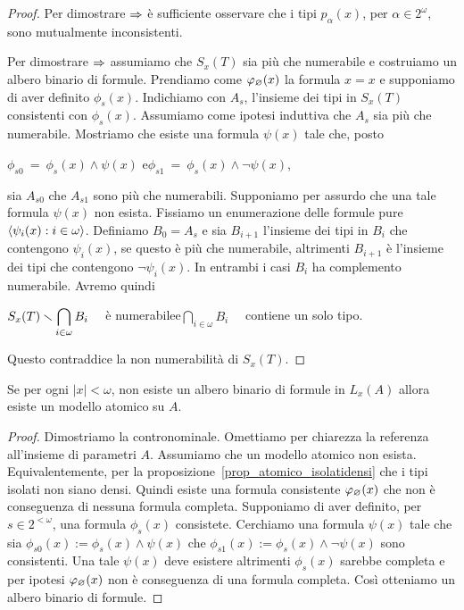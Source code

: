 \begin{proof}
Per dimostrare $\Rightarrow$ \`e sufficiente osservare che i tipi $p_\alpha(x)$, per $\alpha\in 2^\omega$, sono mutualmente inconsistenti.

Per dimostrare $\Rightarrow$ assumiamo che $S_x(T)$ sia pi\`u che numerabile e costruiamo un albero binario di formule. Prendiamo come $\varphi_\varnothing(x)$ la formula $x=x$ e supponiamo di aver definito $\phi_s(x)$. Indichiamo con $A_s$, l'insieme dei tipi in $S_x(T)$ consistenti con $\phi_s(x)$. Assumiamo come ipotesi induttiva che $A_s$ sia pi\`u che numerabile. Mostriamo che esiste una formula $\psi(x)$ tale che, posto

\hfil$\phi_{s0}\ =\ \phi_s(x)\wedge\psi(x)$ \hfil e\hfil $\phi_{s1}\ =\ \phi_s(x)\wedge\neg\psi(x)$,

sia $A_{s0}$ che $A_{s1}$ sono pi\`u che numerabili. Supponiamo per assurdo che una tale formula $\psi(x)$ non esista. Fissiamo un enumerazione delle formule pure $\langle\psi_i(x):i\in\omega\rangle$. %
Definiamo $B_0=A_s$ e sia $B_{i+1}$ l'insieme dei tipi in $B_i$ che contengono $\psi_i(x)$, se questo \`e pi\`u che numerabile, altrimenti $B_{i+1}$ \`e l'insieme dei tipi che contengono $\neg\psi_i(x)$. In entrambi i casi $B_i$ ha complemento numerabile. Avremo quindi 

\hfil$\displaystyle S_x(T)\smallsetminus\bigcap_{i\in\omega}B_i$ \ \ \`e numerabile\hfil e\hfil $\displaystyle\bigcap_{i\in\omega}B_i$ \ \ contiene un solo tipo.

Questo  contraddice la non numerabilit\`a di $S_x(T)$.
\end{proof}


\begin{proposition}
Se per ogni $|x|<\omega$, non esiste un albero binario di formule in $L_x(A)$ allora esiste un modello atomico su $A$.
\end{proposition}

\begin{proof}
Dimostriamo la contronominale. Omettiamo per chiarezza la referenza all'insieme di parametri $A$. Assumiamo che un modello atomico non esista. Equivalentemente, per la proposizione~\ref{prop_atomico_isolatidensi} che i tipi isolati non siano densi. Quindi esiste una formula consistente $\varphi_\varnothing(x)$ che non \`e conseguenza di nessuna formula completa. Supponiamo di aver definito, per $s\in 2^{<\omega}$, una formula $\phi_s(x)$ consistete. Cerchiamo una formula $\psi(x)$ tale che sia $\phi_{s0}(x):=\phi_s(x)\wedge\psi(x)$ che $\phi_{s1}(x):=\phi_s(x)\wedge\neg\psi(x)$ sono consistenti. Una tale $\psi(x)$ deve esistere altrimenti $\phi_s(x)$ sarebbe completa e per ipotesi $\varphi_\varnothing(x)$ non \`e conseguenza di una formula completa. Cos\`i otteniamo un albero binario di formule.
\end{proof}


